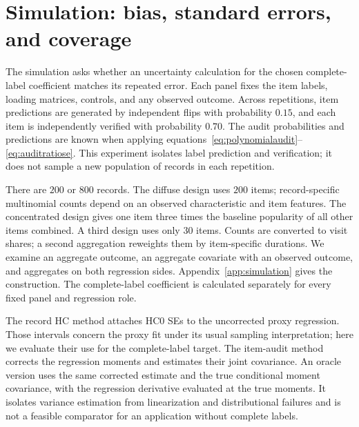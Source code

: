 \section{Simulation: bias, standard errors, and coverage}\label{sec:simulation}
The simulation asks whether an uncertainty calculation for the chosen
complete-label coefficient matches its repeated error. Each panel fixes
the item labels, loading matrices, controls, and any observed outcome.
Across repetitions, item predictions are generated by independent flips
with probability $0.15$, and each item is independently verified with
probability $0.70$. The audit probabilities and predictions are known when
applying equations~\eqref{eq:polynomialaudit}--\eqref{eq:auditratiose}.
This experiment isolates label prediction and verification; it does not
sample a new population of records in each repetition.

There are $200$ or $800$ records. The diffuse design uses $200$ items;
record-specific multinomial counts depend on an observed characteristic
and item features. The concentrated design gives one item three times the
baseline popularity of all other items combined. A third design uses only
$30$ items. Counts are converted to visit shares; a second aggregation
reweights them by item-specific durations. We examine an aggregate outcome,
an aggregate covariate with an observed outcome, and aggregates on both
regression sides. Appendix~\ref{app:simulation} gives the construction.
The complete-label coefficient is calculated separately for every fixed
panel and regression role.

The record HC method attaches HC0 SEs to the uncorrected proxy regression.
Those intervals concern the proxy fit under its usual sampling
interpretation; here we evaluate their use for the complete-label target.
The item-audit method corrects the regression moments and estimates their
joint covariance. An oracle version uses the same corrected estimate and
the true conditional moment covariance, with the regression derivative
evaluated at the true moments. It isolates variance estimation from
linearization and distributional failures and is not a feasible comparator
for an application without complete labels.

